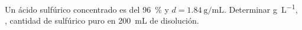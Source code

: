 Un ácido sulfúrico concentrado es del \SI{96}{\percent} y $d = \SI{1,84}{\gram\per\milli\liter}$. Determinar \si{\gram\per\liter}, \si{\Molar}, cantidad de sulfúrico puro en \SI{200}{\milli\liter} de disolución.
